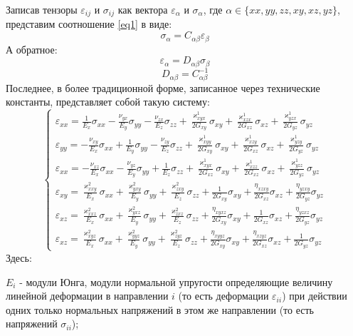 \documentclass[a4paper,12pt]{article}
\begin{document}
Записав тензоры $\varepsilon_{ij}$ и $\sigma_{ij}$ как вектора $\varepsilon_{\alpha}$ и $\sigma_{\alpha}$, где $\alpha \in \{xx, yy, zz, xy, xz, yz\}$,
представим соотношение \ref{eq1} в виде:
$$
    \sigma_{\alpha} = C_{\alpha\beta}\varepsilon_{\beta}
$$
А обратное:
$$
    \varepsilon_{\alpha} = D_{\alpha\beta}\sigma_{\beta}
$$
$$
D_{\alpha\beta} = C^{-1}_{\alpha\beta}
$$
Последнее, в более традиционной форме, записанное через технические константы, представляет собой такую систему:
\begin{equation*}
    \begin{cases}
        \varepsilon_{xx} = \frac{1}{E_x}\sigma_{xx} - \frac{\nu_{yx}}{E_y}\sigma_{yy} - \frac{\nu_{zx}}{E_z}\sigma_{zz} + \frac{\varkappa^1_{xyx}}{2G_{xy}}\sigma_{xy} + \frac{\varkappa^1_{xzx}}{2G_{xz}}\sigma_{xz} + \frac{\varkappa^1_{yzx}}{2G_{yz}}\sigma_{yz}\\
        \varepsilon_{yy} = - \frac{\nu_{xy}}{E_x}\sigma_{xx} + \frac{1}{E_y}\sigma_{yy} - \frac{\nu_{zy}}{E_z}\sigma_{zz} + \frac{\varkappa^1_{xyy}}{2G_{xy}}\sigma_{xy} + \frac{\varkappa^1_{xzy}}{2G_{xz}}\sigma_{xz} + \frac{\varkappa^1_{yzy}}{2G_{yz}}\sigma_{yz}\\
        \varepsilon_{xx} = - \frac{\nu_{xz}}{E_x}\sigma_{xx} - \frac{\nu_{yz}}{E_y}\sigma_{yy} + \frac{1}{E_z}\sigma_{zz} + \frac{\varkappa^1_{xyx}}{2G_{xz}}\sigma_{xy} + \frac{\varkappa^1_{xzz}}{2G_{xz}}\sigma_{xz} + \frac{\varkappa^1_{yzz}}{2G_{yz}}\sigma_{yz}\\
        \varepsilon_{xy} = \frac{\varkappa^2_{xxy}}{E_x}\sigma_{xx} + \frac{\varkappa^2_{yxy}}{E_y}\sigma_{yy} + \frac{\varkappa^2_{zxy}}{E_z}\sigma_{zz} + \frac{1}{2G_{xy}}\sigma_{xy} + \frac{\eta_{xzxy}}{2G_{xz}}\sigma_{xz} + \frac{\eta_{yzxy}}{2G_{yz}}\sigma_{yz}\\
        \varepsilon_{xz} = \frac{\varkappa^2_{xxz}}{E_x}\sigma_{xx} + \frac{\varkappa^2_{yxz}}{E_y}\sigma_{yy} + \frac{\varkappa^2_{zxz}}{E_z}\sigma_{zz} + \frac{\eta_{xyxz}}{2G_{xy}}\sigma_{xy} + \frac{1}{2G_{xz}}\sigma_{xz} + \frac{\eta_{yzxz}}{2G_{yz}}\sigma_{yz}\\
        \varepsilon_{xz} = \frac{\varkappa^2_{xyz}}{E_x}\sigma_{xx} + \frac{\varkappa^2_{yyz}}{E_y}\sigma_{yy} + \frac{\varkappa^2_{zyz}}{E_z}\sigma_{zz} + \frac{\eta_{xyyz}}{2G_{xy}}\sigma_{xy} + \frac{\eta_{xzyz}}{2G_{xz}}\sigma_{xz} + \frac{1}{2G_{yz}}\sigma_{yz}
    \end{cases}
\end{equation*}
Здесь:

$E_i$ - модули Юнга, модули нормальной упругости определяющие величину линейной деформации в направлении $i$ (то есть деформации $\varepsilon_{ii}$) при действии одних только нормальных напряжений в этом же направлении (то есть напряжений $\sigma_{ii}$);
\end{document}

